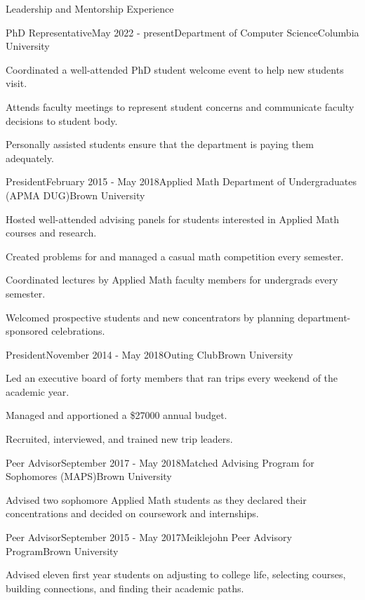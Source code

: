 \documentclass{resume} %
\begin{document}
\begin{rSection}{Leadership and Mentorship Experience}

\begin{rSubsection}{PhD Representative}{May 2022 - present}{Department of Computer Science}{Columbia University}
\item Coordinated a well-attended PhD student welcome event to help new students visit.
\item Attends faculty meetings to represent student concerns and communicate faculty decisions to student body.
\item Personally assisted students ensure that the department is paying them adequately.
\end{rSubsection}

\begin{rSubsection}{President}{February 2015 - May 2018}{Applied Math Department of Undergraduates (APMA DUG)}{Brown University}
\item Hosted well-attended advising panels for students interested in Applied Math courses and research.
\item Created problems for and managed a casual math competition every semester.
\item Coordinated lectures by Applied Math faculty members for undergrads every semester.
\item Welcomed prospective students and new concentrators by planning department-sponsored celebrations.
\end{rSubsection}

\begin{rSubsection}{President}{November 2014 - May 2018}{Outing Club}{Brown University}
\item Led an executive board of forty members that ran trips every weekend of the academic year.
\item Managed and apportioned a \$27000 annual budget.
\item Recruited, interviewed, and trained new trip leaders.
\end{rSubsection}

\begin{rSubsection}{Peer Advisor}{September 2017 - May 2018}{Matched Advising Program for Sophomores (MAPS)}{Brown University}
\item Advised two sophomore Applied Math students as they declared their concentrations and decided on coursework and internships.
\end{rSubsection}

\begin{rSubsection}{Peer Advisor}{September 2015 - May 2017}{Meiklejohn Peer Advisory Program}{Brown University}
\item Advised eleven first year students on adjusting to college life, selecting courses, building connections, and finding their academic paths.
\end{rSubsection}

\end{rSection}
\end{document}
